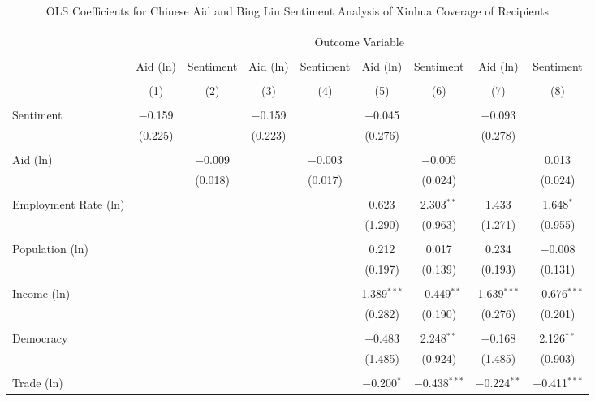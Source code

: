 
\begin{sidewaystable}[!htbp] \centering 
  \caption{OLS Coefficients for Chinese Aid and Bing Liu Sentiment Analysis of Xinhua Coverage of Recipients} 
  \label{} 
\begin{tabular}{@{\extracolsep{0pt}}lcccccccc} 
\\[-1.8ex]\hline 
\hline \\[-1.8ex] 
 & \multicolumn{8}{c}{Outcome Variable} \\ 
\cline{2-9} 
\\[-1.8ex] & Aid (ln) & Sentiment & Aid (ln) & Sentiment & Aid (ln) & Sentiment & Aid (ln) & Sentiment \\ 
\\[-1.8ex] & (1) & (2) & (3) & (4) & (5) & (6) & (7) & (8)\\ 
\hline \\[-1.8ex] 
 Sentiment & $-$0.159 &  & $-$0.159 &  & $-$0.045 &  & $-$0.093 &  \\ 
  & (0.225) &  & (0.223) &  & (0.276) &  & (0.278) &  \\ 
  & & & & & & & & \\ 
 Aid (ln) &  & $-$0.009 &  & $-$0.003 &  & $-$0.005 &  & 0.013 \\ 
  &  & (0.018) &  & (0.017) &  & (0.024) &  & (0.024) \\ 
  & & & & & & & & \\ 
 Employment Rate (ln) &  &  &  &  & 0.623 & 2.303$^{**}$ & 1.433 & 1.648$^{*}$ \\ 
  &  &  &  &  & (1.290) & (0.963) & (1.271) & (0.955) \\ 
  & & & & & & & & \\ 
 Population (ln) &  &  &  &  & 0.212 & 0.017 & 0.234 & $-$0.008 \\ 
  &  &  &  &  & (0.197) & (0.139) & (0.193) & (0.131) \\ 
  & & & & & & & & \\ 
 Income (ln) &  &  &  &  & 1.389$^{***}$ & $-$0.449$^{**}$ & 1.639$^{***}$ & $-$0.676$^{***}$ \\ 
  &  &  &  &  & (0.282) & (0.190) & (0.276) & (0.201) \\ 
  & & & & & & & & \\ 
 Democracy &  &  &  &  & $-$0.483 & 2.248$^{**}$ & $-$0.168 & 2.126$^{**}$ \\ 
  &  &  &  &  & (1.485) & (0.924) & (1.485) & (0.903) \\ 
  & & & & & & & & \\ 
 Trade (ln) &  &  &  &  & $-$0.200$^{*}$ & $-$0.438$^{***}$ & $-$0.224$^{**}$ & $-$0.411$^{***}$ \\ 

\end{tabular}
\end{sidewaystable}
